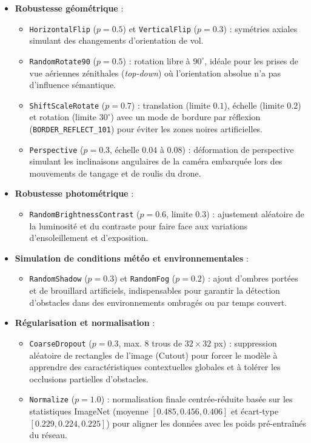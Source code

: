\begin{itemize}[leftmargin=1.8em, itemsep=4pt]
  \item \textbf{Robustesse géométrique} :
    \begin{itemize}[label=\textbullet, leftmargin=1.2em]
      \item \texttt{HorizontalFlip} ($p = 0.5$) et \texttt{VerticalFlip} ($p = 0.3$) : symétries axiales simulant des changements d'orientation de vol.
      \item \texttt{RandomRotate90} ($p = 0.5$) : rotation libre à $90^\circ$, idéale pour les prises de vue aériennes zénithales (\textit{top-down}) où l'orientation absolue n'a pas d'influence sémantique.
      \item \texttt{ShiftScaleRotate} ($p = 0.7$) : translation (limite $0.1$), échelle (limite $0.2$) et rotation (limite $30^\circ$) avec un mode de bordure par réflexion (\texttt{BORDER\_REFLECT\_101}) pour éviter les zones noires artificielles.
      \item \texttt{Perspective} ($p = 0.3$, échelle $0.04$ à $0.08$) : déformation de perspective simulant les inclinaisons angulaires de la caméra embarquée lors des mouvements de tangage et de roulis du drone.
    \end{itemize}
  \item \textbf{Robustesse photométrique} :
    \begin{itemize}[label=\textbullet, leftmargin=1.2em]
      \item \texttt{RandomBrightnessContrast} ($p = 0.6$, limite $0.3$) : ajustement aléatoire de la luminosité et du contraste pour faire face aux variations d'ensoleillement et d'exposition.
    \end{itemize}
  \item \textbf{Simulation de conditions météo et environnementales} :
    \begin{itemize}[label=\textbullet, leftmargin=1.2em]
      \item \texttt{RandomShadow} ($p = 0.3$) et \texttt{RandomFog} ($p = 0.2$) : ajout d'ombres portées et de brouillard artificiels, indispensables pour garantir la détection d'obstacles dans des environnements ombragés ou par temps couvert.
    \end{itemize}
  \item \textbf{Régularisation et normalisation} :
    \begin{itemize}[label=\textbullet, leftmargin=1.2em]
      \item \texttt{CoarseDropout} ($p = 0.3$, max. 8 trous de $32\times32$ px) : suppression aléatoire de rectangles de l'image (Cutout) pour forcer le modèle à apprendre des caractéristiques contextuelles globales et à tolérer les occlusions partielles d'obstacles.
      \item \texttt{Normalize} ($p = 1.0$) : normalisation finale centrée-réduite basée sur les statistiques ImageNet (moyenne $[0.485, 0.456, 0.406]$ et écart-type $[0.229, 0.224, 0.225]$) pour aligner les données avec les poids pré-entraînés du réseau.
    \end{itemize}
\end{itemize}

